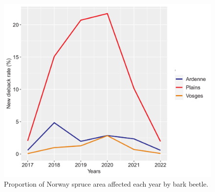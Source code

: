 \documentclass[3p,procedia]{elsarticle}
\begin{document}
\begin{figure}[htbp] 
   \centering
   \includegraphics[width=0.6 \textwidth]{Annual_evol_Ardennes_vosges_plaines.png}
    \caption{Proportion of Norway spruce area affected each year  by bark beetle.}
    \label{evol_gen}
\end{figure}

    
\end{document}
